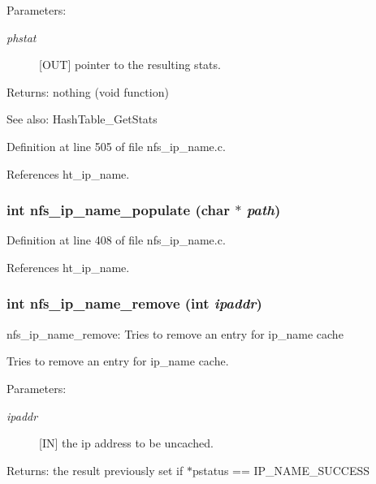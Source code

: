 \begin{Desc}
\item[Parameters:]
\begin{description}
\item[{\em phstat}][OUT] pointer to the resulting stats.\end{description}
\end{Desc}
\begin{Desc}
\item[Returns:]nothing (void function)\end{Desc}
\begin{Desc}
\item[See also:]Hash\-Table\_\-Get\-Stats \end{Desc}


Definition at line 505 of file nfs\_\-ip\_\-name.c.

References ht\_\-ip\_\-name.
\subsubsection{\setlength{\rightskip}{0pt plus 5cm}int nfs\_\-ip\_\-name\_\-populate (char $\ast$ {\em path})}\label{nfs__ip__name_8c_a12}




Definition at line 408 of file nfs\_\-ip\_\-name.c.

References ht\_\-ip\_\-name.
\subsubsection{\setlength{\rightskip}{0pt plus 5cm}int nfs\_\-ip\_\-name\_\-remove (int {\em ipaddr})}\label{nfs__ip__name_8c_a10}


nfs\_\-ip\_\-name\_\-remove: Tries to remove an entry for ip\_\-name cache

Tries to remove an entry for ip\_\-name cache.

\begin{Desc}
\item[Parameters:]
\begin{description}
\item[{\em ipaddr}][IN] the ip address to be uncached.\end{description}
\end{Desc}
\begin{Desc}
\item[Returns:]the result previously set if $\ast$pstatus == IP\_\-NAME\_\-SUCCESS \end{Desc}



